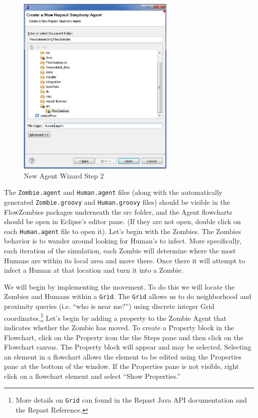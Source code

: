\documentclass[11pt]{amsart}
\begin{document}
\begin{figure}[h]
\begin{center}
\vspace{.2in}
\centerline {
\includegraphics[width=3in]{figs/newAgentWiz_2.eps}
}
\caption{New Agent Wizard Step 2}
\label{fig:newagent2}
\end{center}
\end{figure}

The \texttt{Zombie.agent}  and \texttt{Human.agent} files (along with the automatically generated \texttt{Zombie.groovy}  and \texttt{Human.groovy} files) should be visible in the FlowZombies packages underneath the src folder, and the Agent flowcharts should be open in Eclipse's editor pane. (If they are not open, double click on each \texttt{Human.agent} file to open it). Let's begin with the Zombies. The Zombies behavior is to wander around looking for Human's to infect. More specifically, each iteration of the simulation, each Zombie will determine where the most Humans are within its local area and move there. Once there it will attempt to infect a Human at that location and turn it into a Zombie. 

We will begin by implementing the movement. To do this we will locate the Zombies and Humans within a \texttt{Grid}. The \texttt{Grid} allows us to do neighborhood and proximity queries (i.e. ``who is near me?'') using discrete integer Grid coordinates.\footnote{More details on \texttt{Grid} can found in the Repast Java API documentation and the Repast Reference.} Let's begin by adding a property to the Zombie Agent that indicates whether the Zombie has moved.  To create a Property block in the Flowchart, click on the Property icon the the Steps pane and then click on the Flowchart canvas.  The Property block will appear and may be selected.  Selecting an element in a flowchart allows the element to be edited using the Properties pane at the bottom of the window.  If the Properties pane is not visible, right click on a flowchart element and select ``Show Properties.''
\end{document}
